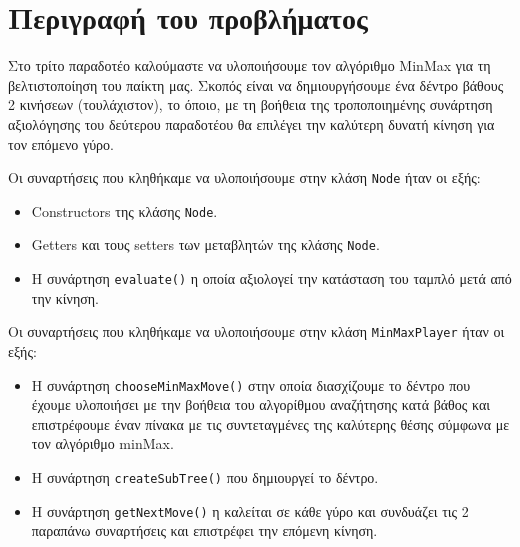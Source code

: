 \chapter{Περιγραφή του προβλήματος}
Στο τρίτο παραδοτέο καλούμαστε να υλοποιήσουμε τον αλγόριθμο MinMax για τη βελτιστοποίηση του παίκτη μας.
Σκοπός είναι να δημιουργήσουμε ένα δέντρο βάθους 2 κινήσεων (τουλάχιστον), το όποιο,
με τη βοήθεια της τροποποιημένης συνάρτηση αξιολόγησης του δεύτερου παραδοτέου θα επιλέγει την καλύτερη δυνατή κίνηση για τον επόμενο γύρο.

Οι συναρτήσεις  που κληθήκαμε να υλοποιήσουμε στην κλάση \lstinline!Node! ήταν οι εξής:
\begin{itemize}
\item Constructors της κλάσης \lstinline!Node!.

\item Getters και τους setters των μεταβλητών της κλάσης \lstinline!Node!.

\item Η συνάρτηση \lstinline!evaluate()! η οποία αξιολογεί την κατάσταση του ταμπλό μετά από την κίνηση.
\end{itemize}

Οι συναρτήσεις  που κληθήκαμε να υλοποιήσουμε στην κλάση \lstinline!MinMaxPlayer! ήταν οι εξής:
\begin{itemize}
\item Η συνάρτηση \lstinline!chooseMinMaxMove()! στην οποία διασχίζουμε το δέντρο που έχουμε υλοποιήσει με
την βοήθεια του αλγορίθμου αναζήτησης κατά βάθος και επιστρέφουμε έναν πίνακα με τις
συντεταγμένες της καλύτερης θέσης σύμφωνα με τον αλγόριθμο minMax.

\item Η συνάρτηση \lstinline!createSubTree()! που δημιουργεί το δέντρο.

\item Η συνάρτηση \lstinline!getNextMove()! η καλείται σε κάθε γύρο και συνδυάζει τις 2 παραπάνω συναρτήσεις και επιστρέφει την επόμενη κίνηση.
\end{itemize}
